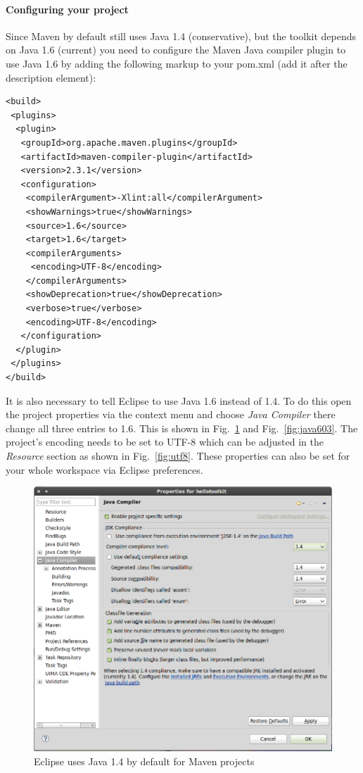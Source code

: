 \documentclass[a4paper,twoside]{book}      %
\begin{document}
\paragraph{Configuring your project} Since Maven by default still uses Java 1.4 (conservative), but the toolkit depends on Java 1.6 (current) you need to configure the Maven Java compiler plugin to use Java 1.6 by adding the following markup to your pom.xml (add it after the description element):
\begin{verbatim}
<build>
 <plugins>
  <plugin>
   <groupId>org.apache.maven.plugins</groupId>
   <artifactId>maven-compiler-plugin</artifactId>
   <version>2.3.1</version>
   <configuration>
    <compilerArgument>-Xlint:all</compilerArgument>
    <showWarnings>true</showWarnings>
    <source>1.6</source>
    <target>1.6</target>
    <compilerArguments>
     <encoding>UTF-8</encoding>
    </compilerArguments>
    <showDeprecation>true</showDeprecation>
    <verbose>true</verbose>
    <encoding>UTF-8</encoding>
   </configuration>
  </plugin>
 </plugins>
</build>
\end{verbatim}
It is also necessary to tell Eclipse to use Java 1.6 instead of 1.4. To do this open the project properties via the context menu and choose \textit{Java Compiler} there change all three entries to 1.6. This is shown in Fig.~\ref{fig:java602} and Fig.~\ref{fig:java603}. The project's encoding needs to be set to UTF-8 which can be adjusted in the \textit{Resource} section as shown in Fig.~\ref{fig:utf8}. These properties can also be set for your whole workspace via Eclipse preferences.
\begin{figure}
\centering
\includegraphics[width=\textwidth]{img/ht08.png}
\caption{Eclipse uses Java 1.4 by default for Maven projects}
\label{fig:java602}
\end{figure}
\end{document}
